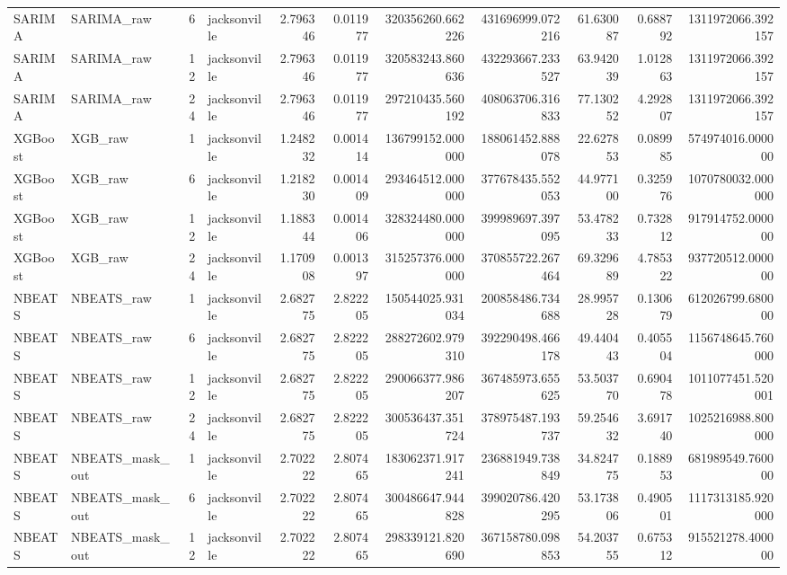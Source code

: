 \begin{longtable}{llrlrrrrrrr}
SARIMA & SARIMA\_raw & 6 & jacksonville & 2.796346 & 0.011977 & 320356260.662226 & 431696999.072216 & 61.630087 & 0.688792 & 1311972066.392157 \\
SARIMA & SARIMA\_raw & 12 & jacksonville & 2.796346 & 0.011977 & 320583243.860636 & 432293667.233527 & 63.942039 & 1.012863 & 1311972066.392157 \\
SARIMA & SARIMA\_raw & 24 & jacksonville & 2.796346 & 0.011977 & 297210435.560192 & 408063706.316833 & 77.130252 & 4.292807 & 1311972066.392157 \\
XGBoost & XGB\_raw & 1 & jacksonville & 1.248232 & 0.001414 & 136799152.000000 & 188061452.888078 & 22.627853 & 0.089985 & 574974016.000000 \\
XGBoost & XGB\_raw & 6 & jacksonville & 1.218230 & 0.001409 & 293464512.000000 & 377678435.552053 & 44.977100 & 0.325976 & 1070780032.000000 \\
XGBoost & XGB\_raw & 12 & jacksonville & 1.188344 & 0.001406 & 328324480.000000 & 399989697.397095 & 53.478233 & 0.732812 & 917914752.000000 \\
XGBoost & XGB\_raw & 24 & jacksonville & 1.170908 & 0.001397 & 315257376.000000 & 370855722.267464 & 69.329689 & 4.785322 & 937720512.000000 \\
NBEATS & NBEATS\_raw & 1 & jacksonville & 2.682775 & 2.822205 & 150544025.931034 & 200858486.734688 & 28.995728 & 0.130679 & 612026799.680000 \\
NBEATS & NBEATS\_raw & 6 & jacksonville & 2.682775 & 2.822205 & 288272602.979310 & 392290498.466178 & 49.440443 & 0.405504 & 1156748645.760000 \\
NBEATS & NBEATS\_raw & 12 & jacksonville & 2.682775 & 2.822205 & 290066377.986207 & 367485973.655625 & 53.503770 & 0.690478 & 1011077451.520001 \\
NBEATS & NBEATS\_raw & 24 & jacksonville & 2.682775 & 2.822205 & 300536437.351724 & 378975487.193737 & 59.254632 & 3.691740 & 1025216988.800000 \\
NBEATS & NBEATS\_mask\_out & 1 & jacksonville & 2.702222 & 2.807465 & 183062371.917241 & 236881949.738849 & 34.824775 & 0.188953 & 681989549.760000 \\
NBEATS & NBEATS\_mask\_out & 6 & jacksonville & 2.702222 & 2.807465 & 300486647.944828 & 399020786.420295 & 53.173806 & 0.490501 & 1117313185.920000 \\
NBEATS & NBEATS\_mask\_out & 12 & jacksonville & 2.702222 & 2.807465 & 298339121.820690 & 367158780.098853 & 54.203755 & 0.675312 & 915521278.400000 \\

\end{longtable}
